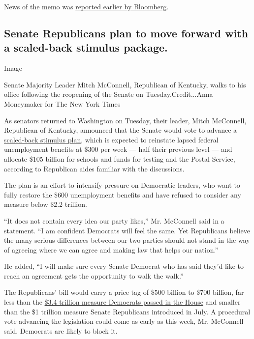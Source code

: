 News of the memo was
\href{https://www.bloomberg.com/news/articles/2020-09-08/jpmorgan-probing-employees-role-in-misuse-of-covid-relief-funds?srnd=premium}{reported
earlier by Bloomberg}.

\hypertarget{senate-republicans-plan-to-move-forward-with-a-scaled-back-stimulus-package}{%
\subsection{Senate Republicans plan to move forward with a scaled-back
stimulus
package.}\label{senate-republicans-plan-to-move-forward-with-a-scaled-back-stimulus-package}}

Image

Senate Majority Leader Mitch McConnell, Republican of Kentucky, walks to
his office following the reopening of the Senate on
Tuesday.Credit...Anna Moneymaker for The New York Times

As senators returned to Washington on Tuesday, their leader, Mitch
McConnell, Republican of Kentucky, announced that the Senate would vote
to advance a
\href{https://slack-redir.net/link?url=https\%3A\%2F\%2Fwww.nytimes3xbfgragh.onion\%2F2020\%2F08\%2F18\%2Fus\%2Fpolitics\%2Frepublicans-coronavirus-stimulus-bill.html}{scaled-back
stimulus plan}, which is expected to reinstate lapsed federal
unemployment benefits at \$300 per week --- half their previous level
--- and allocate \$105 billion for schools and funds for testing and the
Postal Service, according to Republican aides familiar with the
discussions.

The plan is an effort to intensify pressure on Democratic leaders, who
want to fully restore the \$600 unemployment benefits and have refused
to consider any measure below \$2.2 trillion.

``It does not contain every idea our party likes,'' Mr. McConnell said
in a statement. ``I am confident Democrats will feel the same. Yet
Republicans believe the many serious differences between our two parties
should not stand in the way of agreeing where we can agree and making
law that helps our nation.''

He added, ``I will make sure every Senate Democrat who has said they'd
like to reach an agreement gets the opportunity to walk the walk.''

The Republicans' bill would carry a price tag of \$500 billion to \$700
billion, far less than the
\href{https://slack-redir.net/link?url=https\%3A\%2F\%2Fwww.nytimes3xbfgragh.onion\%2F2020\%2F05\%2F15\%2Fus\%2Fpolitics\%2Fhouse-simulus-vote.html}{\$3.4
trillion measure Democrats passed in the House} and smaller than the \$1
trillion measure Senate Republicans introduced in July. A procedural
vote advancing the legislation could come as early as this week, Mr.
McConnell said. Democrats are likely to block it.

